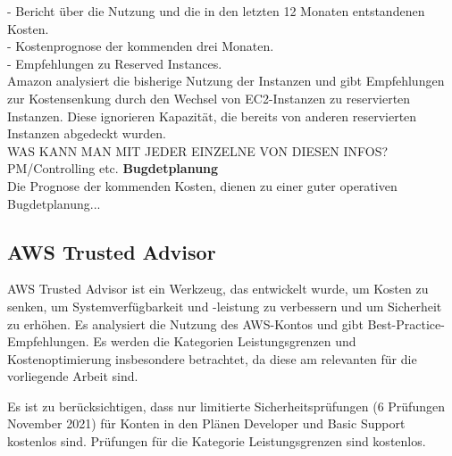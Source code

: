 - Bericht über die Nutzung und die in den letzten 12 Monaten entstandenen Kosten.\\
- Kostenprognose der kommenden drei Monaten.\\
- Empfehlungen zu Reserved Instances.\\
Amazon analysiert die bisherige Nutzung der Instanzen und gibt Empfehlungen zur Kostensenkung durch den Wechsel von EC2-Instanzen zu reservierten Instanzen. Diese ignorieren Kapazität, die bereits von anderen reservierten Instanzen abgedeckt wurden.
\\
WAS KANN MAN MIT JEDER EINZELNE VON DIESEN INFOS? PM/Controlling etc. 
\textbf{Bugdetplanung}\\
Die Prognose der kommenden Kosten, dienen zu einer guter operativen Bugdetplanung...



\subsection{AWS Trusted Advisor}

AWS Trusted Advisor ist ein Werkzeug, das entwickelt wurde, um Kosten zu senken, um Systemverfügbarkeit und -leistung zu verbessern und um Sicherheit zu erhöhen. Es analysiert die Nutzung des AWS-Kontos und gibt Best-Practice-Empfehlungen.
Es werden die Kategorien Leistungsgrenzen und Kostenoptimierung insbesondere betrachtet, da diese am relevanten für die vorliegende Arbeit sind.

Es ist zu berücksichtigen, dass nur limitierte Sicherheitsprüfungen (6 Prüfungen November 2021) für Konten in den Plänen Developer und Basic Support kostenlos sind. Prüfungen für die Kategorie Leistungsgrenzen sind kostenlos.

